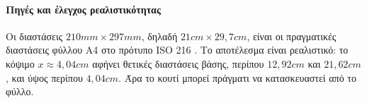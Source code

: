 \paragraph{Πηγές και έλεγχος ρεαλιστικότητας}
Οι διαστάσεις \(210\si{mm}\times297\si{mm}\), δηλαδή
\(21\si{cm}\times29{,}7\si{cm}\), είναι οι πραγματικές διαστάσεις
φύλλου Α4 στο πρότυπο ISO 216 \cite{iso216PaperSizes}. Το αποτέλεσμα
είναι ρεαλιστικό: το κόψιμο \(x\approx4{,}04\si{cm}\) αφήνει θετικές
διαστάσεις βάσης, περίπου \(12{,}92\si{cm}\) και \(21{,}62\si{cm}\), και
ύψος περίπου \(4{,}04\si{cm}\). Άρα το κουτί μπορεί πράγματι να
κατασκευαστεί από το φύλλο.
